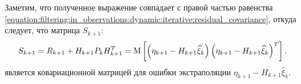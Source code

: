 Заметим, что полученное выражение совпадает с правой частью равенства \eqref{equation:filtering:in_observations:dynamic:iterative:residual_covariance}, откуда следует, что
матрица $S_{k+1}$:
$$
	S_{k+1}
	= R_{k+1} + H_{k+1} P_k H_{k+1}^T
	= \mathrm{M} \left [ \left ( \eta_{k+1} - H_{k+1} \widehat{\xi}_k \right ) \left ( \eta_{k+1} - H_{k+1} \widehat{\xi}_k \right )^T \right ]
	.
$$
является ковариационной матрицей для ошибки экстраполяции $\eta_{k+1} - H_{k+1} \widehat{\xi}_k$.
